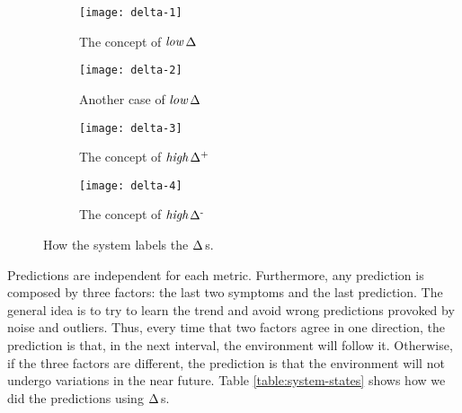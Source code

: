 \documentclass{llncs}
\newcommand{\ourDelta}[2][]{\ensuremath{\Delta\textsuperscript{\text{#1}}
\textsubscript{\text{#2}}}}
\newcommand{\high}[1][ ]{\ensuremath{\text{\emph{high}}#1}}
\newcommand{\low}[1][ ]{\ensuremath{\text{\emph{low}}#1}}
\newcommand{\highDelta}[2][]{\high{\ourDelta[#1]{#2}}}
\newcommand{\lowDelta}[2][]{\low{\ourDelta[#1]{#2}}}
\begin{document}
\begin{figure}[h]
	\centering
	\begin{subfigure}[t]{0.21\textwidth}
		\centering
		
\texttt{[image: delta-1]}
		\caption{The concept of \lowDelta{}}
		\label{fig:delta-low-plus}
	\end{subfigure}\qquad
	\begin{subfigure}[t]{0.21\textwidth}
		\centering
		
\texttt{[image: delta-2]}
		\caption{Another case of \lowDelta{}}
		\label{fig:delta-low-minus}
	\end{subfigure}\qquad
	\begin{subfigure}[t]{0.21\textwidth}
		\centering
		
\texttt{[image: delta-3]}
		\caption{The concept of \highDelta[+]{}}
		\label{fig:delta-high-plus}
	\end{subfigure}\qquad
	\begin{subfigure}[t]{0.21\textwidth}
		\centering
		
\texttt{[image: delta-4]}
		\caption{The concept of \highDelta[-]{}}
		\label{fig:delta-high-minus}
	\end{subfigure}\caption{How the system labels the \ourDelta{}s.}
	\label{fig:delta}

\end{figure}

Predictions are independent for each metric.
Furthermore, any prediction is 
composed by three factors: the last two symptoms and the last prediction. The 
general idea is to try to learn the trend and avoid wrong predictions provoked 
by noise and outliers. Thus, every time that two factors agree in one 
direction, the prediction is that, in the next interval, the environment will 
follow it. 
Otherwise, if the three factors are different, the prediction is that the 
environment will not undergo variations in the near future. 
Table \ref{table:system-states} shows how we did the predictions using
\ourDelta{}s.
\end{document}
